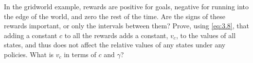 
\begin{exercise}[Exercise 3.15]

In the gridworld example, rewards are positive for goals, negative for running into the edge of the world, and zero the rest of the time.
Are the signs of these rewards important, or only the intervals between them?
Prove, using \eqref{eq:3.8}, that adding a constant $c$ to all the rewards adds a constant, $v_c$, to the values of all states, and thus does not affect the relative values of any states under any policies.
What is $v_c$ in terms of $c$ and $\gamma$?

\end{exercise}


